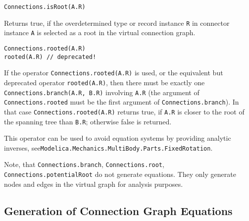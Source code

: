 \begin{operatordefinition}
\begin{synopsis}\begin{lstlisting}
Connections.isRoot(A.R)
\end{lstlisting}\end{synopsis}
\begin{semantics}
Returns true, if the overdetermined type or record instance \lstinline!R! in connector instance \lstinline!A! is selected as a root in the virtual connection graph.
\end{semantics}
\end{operatordefinition}

\begin{operatordefinition}
\begin{synopsis}\begin{lstlisting}
Connections.rooted(A.R)
rooted(A.R) // deprecated!
\end{lstlisting}\end{synopsis}
\begin{semantics}
If the operator \lstinline!Connections.rooted(A.R)! is used, or the equivalent but deprecated operator \lstinline!rooted(A.R)!, then there must be exactly one \lstinline!Connections.branch(A.R, B.R)! involving \lstinline!A.R! (the argument of \lstinline!Connections.rooted! must be the first argument of \lstinline!Connections.branch!).
In that case \lstinline!Connections.rooted(A.R)! returns true, if \lstinline!A.R! is closer to the root of the spanning tree than \lstinline!B.R!; otherwise false is returned.

\begin{nonnormative}
This operator can be used to avoid equation systems by providing analytic inverses, see\linebreak[4] \lstinline!Modelica.Mechanics.MultiBody.Parts.FixedRotation!.
\end{nonnormative}
\end{semantics}
\end{operatordefinition}

\begin{nonnormative}
Note, that \lstinline!Connections.branch!, \lstinline!Connections.root!, \lstinline!Connections.potentialRoot! do not generate equations.
They only generate nodes and edges in the virtual graph for analysis purposes.
\end{nonnormative}


\subsection{Generation of Connection Graph Equations}\label{generation-of-connection-graph-equations}

